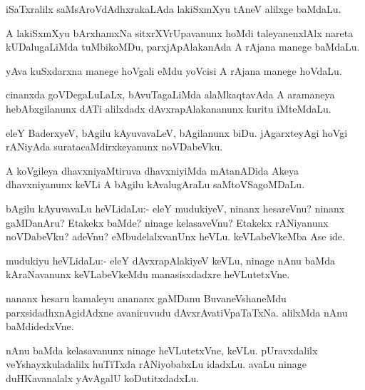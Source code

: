 \begin{mng}
iSaTxralilx saMsAroVdAdhxrakaLAda lakiSxmXyu tAneV alilxge baMdaLu.
\end{mng}

\begin{mng}
A lakiSxmXyu bArxhamxNa sitxrXVrUpavanunx hoMdi taleyanenxlAlx nareta kUDalugaLiMda tuMbikoMDu, parxjApAlakanAda A rAjana manege baMdaLu.
\end{mng}

\begin{mng}
yAva kuSxdarxna manege hoVgali eMdu yoVcisi A rAjana manege hoVdaLu.
\end{mng}

\begin{mng}
cinanxda goVDegaLuLaLx, bAvuTagaLiMda alaMkaqtavAda A aramaneya hebAbxgilanunx dATi alilxdadx dAvxrapAlakananunx kuritu iMteMdaLu.
\end{mng}

\begin{mng}
eleY BaderxyeV, bAgilu kAyuvavaLeV, bAgilanunx biDu. jAgarxteyAgi hoVgi rANiyAda suratacaMdirxkeyanunx noVDabeVku.
\end{mng}

\begin{mng}
A koVgileya dhavxniyaMtiruva dhavxniyiMda mAtanADida Akeya dhavxniyanunx keVLi A bAgilu kAvalugAraLu saMtoVSagoMDaLu.
\end{mng}

\begin{mng}
bAgilu kAyuvavaLu heVLidaLu:- eleY mudukiyeV, ninanx hesareVnu? ninanx gaMDanAru? Etakekx baMde? ninage kelasaveVnu? Etakekx rANiyanunx noVDabeVku? adeVnu? eMbudelalxvanUnx heVLu. keVLabeVkeMba Ase ide.
\end{mng}

\begin{mng}
mudukiyu heVLidaLu:- eleY dAvxrapAlakiyeV keVLu, ninage nAnu baMda kAraNavanunx keVLabeVkeMdu manasisxdadxre heVLutetxVne.
\end{mng}

\begin{mng}
nananx hesaru kamaleyu anananx gaMDanu BuvaneVshaneMdu parxsidadhxnAgidAdxne avaniruvudu dAvxrAvatiVpaTaTxNa. alilxMda nAnu baMdidedxVne.
\end{mng}

\begin{mng}
nAnu baMda kelasavanunx ninage heVLutetxVne, keVLu. pUravxdalilx veYshayxkuladalilx huTiTxda rANiyobabxLu idadxLu. avaLu ninage duHKavanalalx yAvAgalU koDutitxdadxLu.
\end{mng}

